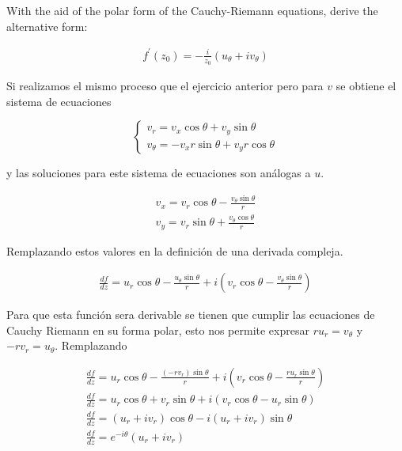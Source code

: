 \begin{problem}{6}
    With the aid of the polar form of the Cauchy-Riemann equations, derive the alternative form:

    \begin{gather*}
        f^{\prime}(z_0) = -\frac{i}{z_0}(u_\theta + iv_\theta)
    \end{gather*}
\end{problem}

Si realizamos el mismo proceso que el ejercicio anterior pero para $v$ se obtiene el sistema de ecuaciones 

\begin{equation*}
    \left\{\begin{matrix}
        v_r = v_x\cos\theta + v_y\sin\theta\\
        v_\theta = - v_x r\sin\theta + v_yr\cos\theta
    \end{matrix}\right.
\end{equation*}

y las soluciones para este sistema de ecuaciones son análogas a $u$.

\begin{gather*}
    v_x = v_r\cos\theta  - \frac{v_\theta\sin\theta}{r}\\
    v_y = v_r\sin\theta + \frac{v_\theta \cos\theta}{r}
\end{gather*}

Remplazando estos valores en la definición de una derivada compleja. 

\begin{gather*}
    \frac{df}{dz} = u_r\cos\theta  - \frac{u_\theta\sin\theta}{r} + i\left(v_r\cos\theta  - \frac{v_\theta\sin\theta}{r}\right)
\end{gather*}

Para que esta función sera derivable se tienen que cumplir las ecuaciones de Cauchy Riemann en su forma polar, esto nos permite expresar $ru_r = v_\theta$ y  $-rv_r = u_\theta$. Remplazando 

\begin{gather*}
    \frac{df}{dz} = u_r\cos\theta  - \frac{(-rv_r)\sin\theta}{r} + i\left(v_r\cos\theta  - \frac{ru_r\sin\theta}{r}\right)\\
    \frac{df}{dz} = u_r\cos\theta  + v_r\sin\theta + i\left(v_r\cos\theta  - u_r\sin\theta\right)\\
    \frac{df}{dz} = (u_r + iv_r)\cos\theta  - i( u_r+iv_r)\sin\theta\\
    \frac{df}{dz} = e^{-i\theta}(u_r + iv_r)
\end{gather*}

